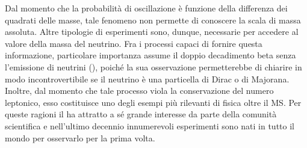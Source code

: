





Dal momento che la probabilità di oscillazione è funzione della differenza dei quadrati delle masse, tale fenomeno non permette di conoscere la scala di massa assoluta. 
Altre tipologie di esperimenti sono, dunque, necessarie per accedere al valore della massa del neutrino.
Fra i processi capaci di fornire questa informazione, particolare importanza assume il doppio decadimento beta senza l'emissione di neutrini (\doppiobeta), poiché la sua osservazione permetterebbe di chiarire in modo incontrovertibile se il neutrino è una particella di Dirac o di Majorana.
Inoltre, dal momento che tale processo viola la conservazione del numero leptonico, esso costituisce uno degli esempi più rilevanti di fisica oltre il MS.
Per queste ragioni il \doppiobeta{} ha attratto a sé grande interesse da parte della comunità scientifica e nell'ultimo decennio innumerevoli esperimenti sono nati in tutto il mondo per osservarlo per la prima volta.
%
%
%
%
%
